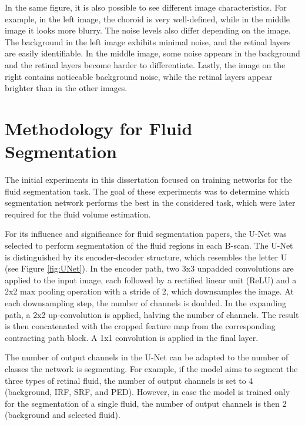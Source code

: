 In the same figure, it is also possible to see different image characteristics. For example, in the left image, the choroid is very well-defined, while in the middle image it looks more blurry. The noise levels also differ depending on the image. The background in the left image exhibits minimal noise, and the retinal layers are easily identifiable. In the middle image, some noise appears in the background and the retinal layers become harder to differentiate. Lastly, the image on the right contains noticeable background noise, while the retinal layers appear brighter than in the other images. 

\section{Methodology for Fluid Segmentation}
The initial experiments in this dissertation focused on training networks for the fluid segmentation task. The goal of these experiments was to determine which segmentation network performs the best in the considered task, which were later required for the fluid volume estimation.
\par
For its influence and significance for fluid segmentation papers, the U-Net \parencite{Ronneberger2015} was selected to perform segmentation of the fluid regions in each B-scan. The U-Net is distinguished by its encoder-decoder structure, which resembles the letter U (see Figure \ref{fig:UNet}). In the encoder path, two 3x3 unpadded convolutions are applied to the input image, each followed by a rectified linear unit (ReLU) and a 2x2 max pooling operation with a stride of 2, which downsamples the image. At each downsampling step, the number of channels is doubled. In the expanding path, a 2x2 up-convolution is applied, halving the number of channels. The result is then concatenated with the cropped feature map from the corresponding contracting path block. A 1x1 convolution is applied in the final layer.
\par
The number of output channels in the U-Net can be adapted to the number of classes the network is segmenting. For example, if the model aims to segment the three types of retinal fluid, the number of output channels is set to 4 (background, IRF, SRF, and PED). However, in case the model is trained only for the segmentation of a single fluid, the number of output channels is then 2 (background and selected fluid).

